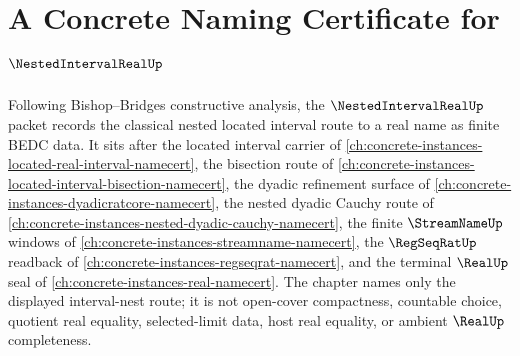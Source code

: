 \chapter{A Concrete Naming Certificate for $\NestedIntervalRealUp$}
\label{ch:concrete-instances-nested-interval-real-namecert}

Following Bishop--Bridges constructive analysis, the $\NestedIntervalRealUp$ packet records the classical nested located interval route to a real name as finite BEDC data. It sits after the located interval carrier of \autoref{ch:concrete-instances-located-real-interval-namecert}, the bisection route of \autoref{ch:concrete-instances-located-interval-bisection-namecert}, the dyadic refinement surface of \autoref{ch:concrete-instances-dyadicratcore-namecert}, the nested dyadic Cauchy route of \autoref{ch:concrete-instances-nested-dyadic-cauchy-namecert}, the finite $\StreamNameUp$ windows of \autoref{ch:concrete-instances-streamname-namecert}, the $\RegSeqRatUp$ readback of \autoref{ch:concrete-instances-regseqrat-namecert}, and the terminal $\RealUp$ seal of \autoref{ch:concrete-instances-real-namecert}. The chapter names only the displayed interval-nest route; it is not open-cover compactness, countable choice, quotient real equality, selected-limit data, host real equality, or ambient $\RealUp$ completeness.

